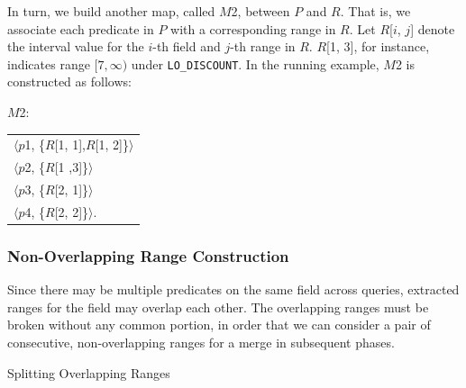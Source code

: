 \documentclass[runningheads]{comsis2}
\def\ropenrange#1{$[{#1})$}
\begin{document}
In turn, we build another map, called $M$2, between $P$ and $R$. 
That is, we associate each predicate in $P$ with a corresponding range in $R$. 
Let $R$[$i$, $j$] denote the interval value for the $i$-th field and $j$-th range in $R$. 
$R$[1, 3], for instance, indicates range \ropenrange{7, \infty} under {\tt LO\_DISCOUNT}. 
In the running example, $M$2 is constructed as follows:

$M$2:
\begin{center}
\begin{tabular}{l}
$\langle${$p$1}, \{$R$[1, 1],$R$[1, 2]\}$\rangle$ \\
$\langle${$p$2}, \{$R$[1 ,3]\}$\rangle$ \\ 
$\langle${$p$3}, \{$R$[2, 1]\}$\rangle$ \\
$\langle${$p$4}, \{$R$[2, 2]\}$\rangle$. \\
\end{tabular}
\end{center} 

\subsubsection{Non-Overlapping Range Construction}

Since there may be multiple predicates on the same field across queries, 
extracted ranges for the field may overlap each other. 
The overlapping ranges must be broken without any common portion, in order 
that we can consider a pair of consecutive, \hbox{non-overlapping} ranges for 
a merge in subsequent phases. 


\begin{algorithm}[t]
\caption{Splitting Overlapping Ranges}
\label{algo:split_overlap}
{
}
\end{algorithm}
\end{document}
